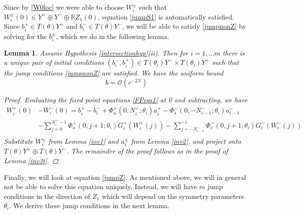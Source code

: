 \documentclass[12pt]{article}
\def\R{{\mathbb R}}
\newtheorem{lemma}{Lemma}
\begin{document}
Since by \eqref{W0loc} we were able to choose $W_i^\pm$ such that $W_i^\pm(0) \in Y^+ \oplus Y^- \oplus \R Z_1(0)$, equation \ref{jumpS1} is automatically satisfied. Since $b_i^+ \in T(\theta) Y^+$ and $b_i^- \in T(\theta) Y^-$, we will be able to satisfy \eqref{jumpnonZ} by solving for the $b_i^\pm$, which we do in the following lemma.

\begin{lemma}\label{inv3nt}
Assume Hypothesis \ref{intersectionhyp}(ii). Then for $i = 1, \dots m$ there is a unique pair of initial conditions $(b_i^-, b_i^+) \in T(\theta_i) Y^- \times T(\theta_i) Y^+$ such that the jump conditions \eqref{jumpnonZ} are satisfied. We have the uniform bound
\begin{equation}\label{bboundt}
b = \mathcal{O}(r^{-2N})
\end{equation}

\begin{proof}
Evaluating the fixed point equations \eqref{FPeqs1} at 0 and subtracting, we have
\begin{align*}
W_i^+(0) &- W_i^-(0) = b_i^+ - b_i^- 
+ \Phi_u^+(0, N_i^+; \theta_i) a_i^+ - \Phi_s^-(0, -N_{i-1}^-; \theta_i) a_{i-1}^- \\
&- \sum_{j = 0}^{N_i^+-1} \Phi_u^+(0, j+1; \theta_i) G_i^+(W_i^+(j)) 
- \sum_{j = -N_{i-1}^-}^{-1} \Phi_s^-(0, j+1; \theta_i) G_i^-(W_i^-(j)) \\
\end{align*}
Substitute $W_i^\pm$ from Lemma \ref{inv1} and $a_i^\pm$ from Lemma \ref{inv2}, and project onto $T(\theta)Y^+ \oplus T(\theta)Y^-$. The remainder of the proof follows as in the proof of Lemma \ref{inv3t}.
\end{proof}
\end{lemma}

Finally, we will look at equation \ref{jumpZ}. As mentioned above, we will in general not be able to solve this equation uniquely. Instead, we will have $m$ jump conditions in the direction of $Z_1$ which will depend on the symmetry parameters $\theta_i$. We derive these jump conditions in the next lemma.
\end{document}
